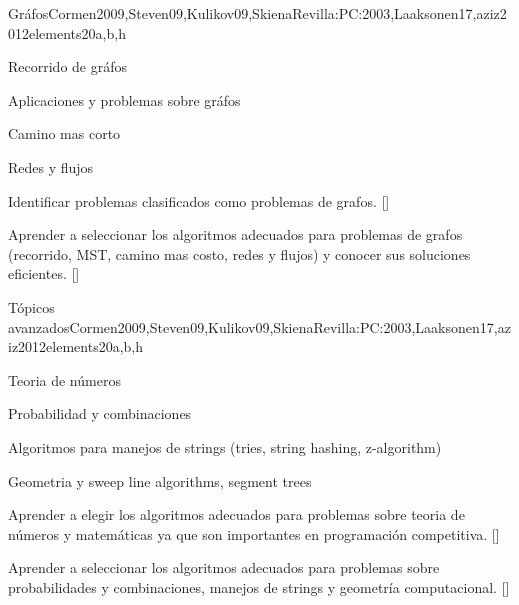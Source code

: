 \begin{syllabus}
  \begin{unit}{Gráfos}{}{Cormen2009,Steven09,Kulikov09,SkienaRevilla:PC:2003,Laaksonen17,aziz2012elements}{20}{a,b,h}
    \begin{topics}
      \item Recorrido de gráfos 
      \item Aplicaciones y problemas sobre gráfos
      \item Camino mas corto
      \item Redes y flujos 
    \end{topics}
    \begin{learningoutcomes}
        \item Identificar problemas clasificados como problemas de grafos. [\Usage]
        \item Aprender a seleccionar los algoritmos adecuados para problemas de grafos (recorrido, MST, camino mas costo, redes y flujos) y conocer sus soluciones eficientes. [\Usage]
    \end{learningoutcomes}
  \end{unit}
  
  \begin{unit}{Tópicos avanzados}{}{Cormen2009,Steven09,Kulikov09,SkienaRevilla:PC:2003,Laaksonen17,aziz2012elements}{20}{a,b,h}
    \begin{topics}
      \item Teoria de números
      \item Probabilidad y combinaciones
      \item Algoritmos para manejos de strings (tries, string hashing, z-algorithm)
      \item Geometria y sweep line algorithms, segment trees
    \end{topics}
    \begin{learningoutcomes}
        \item Aprender a elegir los algoritmos adecuados para problemas sobre teoria de números y matemáticas ya que son importantes en programación competitiva. [\Usage]
        \item Aprender a seleccionar los algoritmos adecuados para problemas sobre probabilidades y combinaciones,  manejos de strings y geometría computacional. [\Usage]
    \end{learningoutcomes}
  \end{unit}
  

\end{syllabus}
